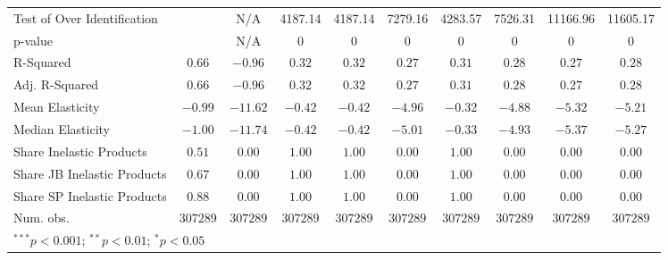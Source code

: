\documentclass{article}
\begin{document}
\begin{appendices}
\begin{table}
{\begin{tabular}{l c c c c c c c c c}
Test of Over Identification &               & N/A           & 4187.14       & 4187.14       & 7279.16       & 4283.57       & 7526.31       & 11166.96      & 11605.17      \\
p-value                     &               & N/A           & 0             & 0             & 0             & 0             & 0             & 0             & 0             \\
R-Squared                   & $0.66$        & $-0.96$       & $0.32$        & $0.32$        & $0.27$        & $0.31$        & $0.28$        & $0.27$        & $0.28$        \\
Adj. R-Squared              & $0.66$        & $-0.96$       & $0.32$        & $0.32$        & $0.27$        & $0.31$        & $0.28$        & $0.27$        & $0.28$        \\
Mean Elasticity             & $-0.99$       & $-11.62$      & $-0.42$       & $-0.42$       & $-4.96$       & $-0.32$       & $-4.88$       & $-5.32$       & $-5.21$       \\
Median Elasticity           & $-1.00$       & $-11.74$      & $-0.42$       & $-0.42$       & $-5.01$       & $-0.33$       & $-4.93$       & $-5.37$       & $-5.27$       \\
Share Inelastic Products    & $0.51$        & $0.00$        & $1.00$        & $1.00$        & $0.00$        & $1.00$        & $0.00$        & $0.00$        & $0.00$        \\
Share JB Inelastic Products & $0.67$        & $0.00$        & $1.00$        & $1.00$        & $0.00$        & $1.00$        & $0.00$        & $0.00$        & $0.00$        \\
Share SP Inelastic Products & $0.88$        & $0.00$        & $1.00$        & $1.00$        & $0.00$        & $1.00$        & $0.00$        & $0.00$        & $0.00$        \\
Num. obs.                   & $307289$      & $307289$      & $307289$      & $307289$      & $307289$      & $307289$      & $307289$      & $307289$      & $307289$      \\
\bottomrule
\multicolumn{10}{l}{\scriptsize{$^{***}p<0.001$; $^{**}p<0.01$; $^{*}p<0.05$}}
\end{tabular}
        }
    \end{table}


\end{appendices}
\end{document}
